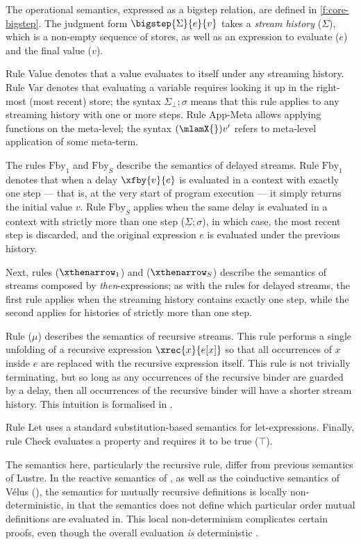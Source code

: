 The operational semantics, expressed as a bigstep relation, are defined in \autoref{f:core-bigstep}.
The judgment form $\bigstep{\Sigma}{e}{v}$ takes a \emph{stream history} ($\Sigma$), which is a non-empty sequence of stores, as well as an expression to evaluate ($e$) and the final value ($v$).

Rule Value denotes that a value evaluates to itself under any streaming history.
Rule Var denotes that evaluating a variable requires looking it up in the right-most (most recent) store; the syntax $\Sigma_\bot; \sigma$ means that this rule applies to any streaming history with one or more steps.
Rule App-Meta allows applying functions on the meta-level; the syntax $(\mlamX{}) v'$ refers to meta-level application of some meta-term.

The rules $\mbox{Fby}_1$ and $\mbox{Fby}_S$ describe the semantics of delayed streams.
Rule $\mbox{Fby}_1$ denotes that when a delay $\xfby{v}{e}$ is evaluated in a context with exactly one step --- that is, at the very start of program execution --- it simply returns the initial value $v$.
Rule $\mbox{Fby}_S$ applies when the same delay is evaluated in a context with strictly more than one step ($\Sigma; \sigma$), in which case, the most recent step is discarded, and the original expression $e$ is evaluated under the previous history.

Next, rules ($\xthenarrow_1$) and ($\xthenarrow_S$) describe the semantics of streams composed by \emph{then}-expressions; as with the rules for delayed streams, the first rule applies when the streaming history contains exactly one step, while the second applies for histories of strictly more than one step.

Rule ($\mu{}$) describes the semantics of recursive streams.
This rule performs a single unfolding of a recursive expression $\xrec{x}{e[x]}$ so that all occurrences of $x$ inside $e$ are replaced with the recursive expression itself.
This rule is not trivially terminating, but so long as any occurrences of the recursive binder are guarded by a delay, then all occurrences of the recursive binder will have a shorter stream history.
This intuition is formalised in \REF{}.

Rule Let uses a standard substitution-based semantics for let-expressions.
Finally, rule Check evaluates a property and requires it to be true ($\top$).

The semantics here, particularly the recursive rule, differ from previous semantics of Lustre.
In the reactive semantics of \citet{caspi1995functional}, as well as the coinductive semantics of Vélus \cite{bourke2017formally} (), the semantics for mutually recursive definitions is locally non-deterministic, in that the semantics does not define which particular order mutual definitions are evaluated in.
This local non-determinism complicates certain proofs, even though the overall evaluation \emph{is} deterministic .

